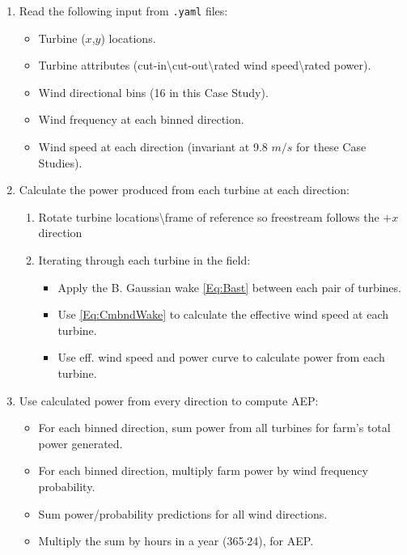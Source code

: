 \documentclass[12pt]{article}
\begin{document}
    \begin{enumerate}
        \item Read the following input from \texttt{.yaml} files:
            \begin{itemize}
                \item Turbine ($x$,$y$) locations.
                \item Turbine attributes (cut-in\textbackslash cut-out\textbackslash rated wind speed\textbackslash rated power).
                \item Wind directional bins (16 in this Case Study).
                \item Wind frequency at each binned direction.
                \item Wind speed at each direction (invariant at 9.8 $m/s$ for these Case Studies).
            \end{itemize}
        \item Calculate the power produced from each turbine at each direction:
            \begin{enumerate}
                \item Rotate turbine locations\textbackslash frame of reference so freestream follows the $+x$ direction
                \item Iterating through each turbine in the field:
                    \begin{itemize}
                        \item Apply the B. Gaussian wake \cref{Eq:Bast} between each pair of turbines.
                        \item Use \cref{Eq:CmbndWake} to calculate the effective wind speed at each turbine.
                        \item Use eff. wind speed and power curve to calculate power from each turbine.
                    \end{itemize}
            \end{enumerate}
        \item Use calculated power from every direction to compute AEP:
        \begin{itemize}
            \item For each binned direction, sum power from all turbines for farm's total power generated.
            \item For each binned direction, multiply farm power by wind frequency probability.
            \item Sum power/probability predictions for all wind directions.
            \item Multiply the sum by hours in a year (365$\cdot$24), for AEP.
        \end{itemize}
    \end{enumerate}
\end{document}
